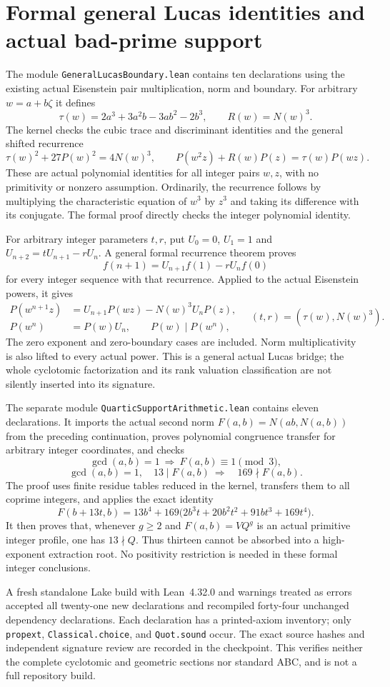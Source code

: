 \section{Formal general Lucas identities and actual bad-prime support}
\label{sec:formal-lucas-support}

The module \texttt{GeneralLucasBoundary.lean} contains ten declarations
using the existing actual Eisenstein pair multiplication, norm and
boundary. For arbitrary $w=a+b\zeta$ it defines
\[
 \tau(w)=2a^3+3a^2b-3ab^2-2b^3,\qquad R(w)=N(w)^3.
\]
The kernel checks the cubic trace and discriminant identities and the
general shifted recurrence
\[
 \tau(w)^2+27P(w)^2=4N(w)^3,\qquad
 P(w^2z)+R(w)P(z)=\tau(w)P(wz).
\]
These are actual polynomial identities for all integer pairs $w,z$,
with no primitivity or nonzero assumption. Ordinarily, the recurrence
follows by multiplying the characteristic equation of $w^3$ by $z^3$
and taking its difference with its conjugate. The formal proof directly
checks the integer polynomial identity.

For arbitrary integer parameters $t,r$, put $U_0=0$, $U_1=1$ and
$U_{n+2}=tU_{n+1}-rU_n$. A general formal recurrence theorem proves
\[
 f(n+1)=U_{n+1}f(1)-rU_nf(0)
\]
for every integer sequence with that recurrence. Applied to the actual
Eisenstein powers, it gives
\[
 \begin{split}
 P(w^{n+1}z)&=U_{n+1}P(wz)-N(w)^3U_nP(z),\\
 P(w^n)&=P(w)U_n,\qquad P(w)\mid P(w^n),
 \end{split}
 \quad (t,r)=(\tau(w),N(w)^3).
\]
The zero exponent and zero-boundary cases are included. Norm
multiplicativity is also lifted to every actual power. This is a general
actual Lucas bridge; the whole cyclotomic factorization and its rank
valuation classification are not silently inserted into its signature.

The separate module \texttt{QuarticSupportArithmetic.lean} contains
eleven declarations. It imports the actual second norm
$F(a,b)=N(ab,N(a,b))$ from the preceding continuation, proves polynomial
congruence transfer for arbitrary integer coordinates, and checks
\[
 \gcd(a,b)=1\ \Longrightarrow\ F(a,b)\equiv1\pmod3,
\]
\[
 \gcd(a,b)=1,\quad 13\mid F(a,b)
 \ \Longrightarrow\quad 169\nmid F(a,b).
\]
The proof uses finite residue tables reduced in the kernel, transfers
them to all coprime integers, and applies the exact identity
\[
 F(b+13t,b)=13b^4+
 169\bigl(2b^3t+20b^2t^2+91bt^3+169t^4\bigr).
\]
It then proves that, whenever $g\ge2$ and
$F(a,b)=VQ^g$ is an actual primitive integer profile, one has
$13\nmid Q$. Thus thirteen cannot be absorbed into a high-exponent
extraction root. No positivity restriction is needed in these formal
integer conclusions.

A fresh standalone Lake build with Lean~4.32.0 and warnings treated as
errors accepted all twenty-one new declarations and recompiled forty-four
unchanged dependency declarations. Each declaration has a printed-axiom
inventory; only \texttt{propext}, \texttt{Classical.choice}, and
\texttt{Quot.sound} occur. The exact source hashes and independent
signature review are recorded in the checkpoint. This verifies neither
the complete cyclotomic and geometric sections nor standard ABC, and is
not a full repository build.
